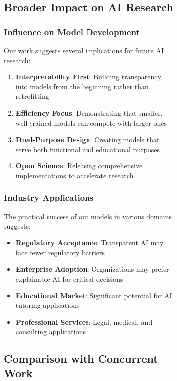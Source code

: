 \begin{figure}[H]
\begin{table}[H]
\begin{figure}[H]
\begin{table}[H]
\subsection{Broader Impact on AI Research}

\subsubsection{Influence on Model Development}

Our work suggests several implications for future AI research:

\begin{enumerate}
    \item \textbf{Interpretability First}: Building transparency into models from the beginning rather than retrofitting
    \item \textbf{Efficiency Focus}: Demonstrating that smaller, well-trained models can compete with larger ones
    \item \textbf{Dual-Purpose Design}: Creating models that serve both functional and educational purposes
    \item \textbf{Open Science}: Releasing comprehensive implementations to accelerate research
\end{enumerate}

\subsubsection{Industry Applications}

The practical success of our models in various domains suggests:

\begin{itemize}
    \item \textbf{Regulatory Acceptance}: Transparent AI may face fewer regulatory barriers
    \item \textbf{Enterprise Adoption}: Organizations may prefer explainable AI for critical decisions
    \item \textbf{Educational Market}: Significant potential for AI tutoring applications
    \item \textbf{Professional Services}: Legal, medical, and consulting applications
\end{itemize}

\subsection{Comparison with Concurrent Work}


\end{table}
\end{figure}
\end{table}
\end{figure}
